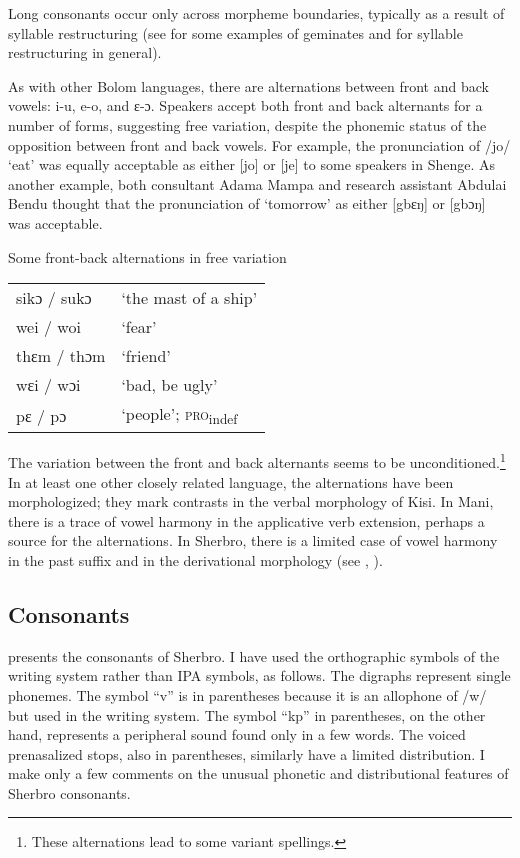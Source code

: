 Long consonants occur only across morpheme boundaries, typically as a result of syllable restructuring (see  for some examples of geminates and  for syllable restructuring in general).

As with other Bolom languages, there are alternations between front and back vowels: i-u, e-o, and ɛ-ɔ. Speakers accept both front and back alternants for a number of forms, suggesting free variation, despite the phonemic status of the opposition between front and back vowels. For example, the pronunciation of /jo/ ‘eat' was equally acceptable as either [jo] or [je] to some speakers in Shenge. As another example, both consultant Adama Mampa and research assistant Abdulai Bendu thought that the pronunciation of ‘tomorrow' as either [gbɛŋ] or [gbɔŋ] was acceptable.

\ea %
\label{ex:17}
Some front-back alternations in free variation\\
\vspace{6pt}
\begin{tabular}{ll}
sikɔ / sukɔ & ‘the mast of a ship'\\
wei / woi & ‘fear'\\
thɛm / thɔm & ‘friend'\\
wɛi / wɔi & ‘bad, be ugly'\\
pɛ / pɔ & ‘people'; \textsc{pro}\textsubscript{indef}
\end{tabular}
\z

The variation between the front and back alternants seems to be unconditioned.\footnote{These alternations lead to some variant spellings.} In at least one other closely related language, the alternations have been morphologized; they mark contrasts in the verbal morphology of Kisi. In Mani, there is a trace of vowel harmony in the applicative verb extension, perhaps a source for the alternations. In Sherbro, there is a limited case of vowel harmony in the past suffix and in the derivational morphology (see , ).

\subsection{Consonants}
\label{sec:2.1.2}\hypertarget{Toc115517755}{}
 presents the consonants of Sherbro. I have used the orthographic symbols of the writing system rather than IPA symbols, as follows. The digraphs represent single phonemes. The symbol “v” is in parentheses because it is an allophone of /w/ but used in the writing system. The symbol “kp” in parentheses, on the other hand, represents a peripheral sound found only in a few words. The voiced prenasalized stops, also in parentheses, similarly have a limited distribution. I make only a few comments on the unusual phonetic and distributional features of Sherbro consonants. 

